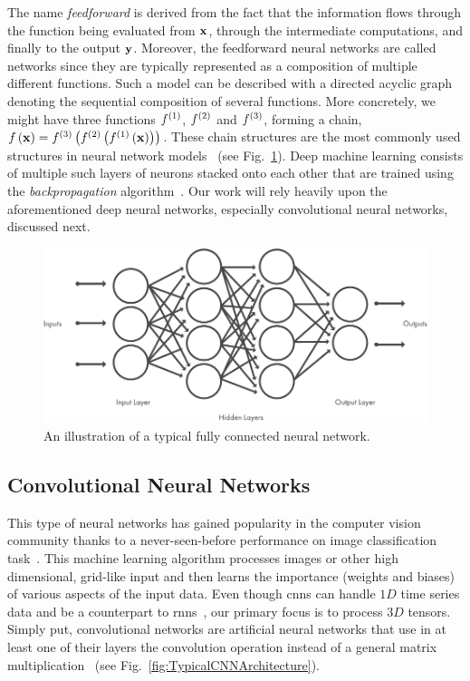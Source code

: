 The name \emph{feedforward} is derived from the fact that the information flows through the function being evaluated from ${\mathbf{x}}$, through the intermediate computations, and ﬁnally to the output ${\mathbf{y}}$. Moreover, the feedforward neural networks are called networks since they are typically represented as a composition of multiple different functions. Such a model can be described with a directed acyclic graph denoting the sequential composition of several functions. More concretely, we might have three functions ${f}^{\left( {1} \right)}$, ${f}^{\left( {2} \right)}$ and ${f}^{\left( {3} \right)}$, forming a chain, ${f} \left( {\mathbf{x}} \right) = {{f}^{\left( {3} \right)}} \left( {{f}^{\left( {2} \right)}} \left( {{f}^{\left( {1} \right)}} \left( {\mathbf{x}} \right) \right) \right)$. These chain structures are the most commonly used structures in neural network models~\cite{Goodfellow-et-al-2016} (see Fig.~\ref{fig:TypicalFCNArchitecture}). Deep machine learning consists of multiple such layers of neurons stacked onto each other that are trained using the \emph{backpropagation} algorithm~\cite{rumelhart:errorpropnonote}. Our work will rely heavily upon the aforementioned deep neural networks, especially convolutional neural networks, discussed next.

\begin{figure}[t]
    \centerline{\includegraphics[width=0.8\linewidth]{figures/theoretical_foundations/typical_fcn_architecture.pdf}}
    \caption[A typical FC architecture]{An illustration of a typical fully connected neural network. }
    \label{fig:TypicalFCNArchitecture}
\end{figure}

\subsection{Convolutional Neural Networks}
\label{ssec:ConvolutionalNeuralNetworks}

This type of neural networks has gained popularity in the computer vision community thanks to a never-seen-before performance on image classification task~\cite{Krizhevsky2012}. This machine learning algorithm processes images or other high dimensional, grid-like input and then learns the importance (weights and biases) of various aspects of the input data. Even though \glspl{cnn} can handle $1D$ time series data and be a counterpart to \glspl{rnn}~\cite{franoischollet2017learning}, our primary focus is to process $3D$ tensors. Simply put, convolutional networks are artificial neural networks that use in at least one of their layers the convolution operation instead of a general matrix multiplication~\cite{Goodfellow-et-al-2016} (see Fig.~\ref{fig:TypicalCNNArchitecture}).

